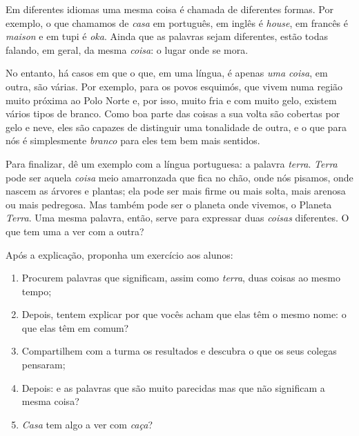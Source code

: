 \documentclass[11pt]{extarticle}
\begin{document}
Em diferentes idiomas uma mesma coisa é chamada de diferentes formas.
Por exemplo, o que chamamos de \textit{casa} em português, em inglês 
é \textit{house}, em francês é \textit{maison} e em tupi é \textit{oka}. 
Ainda que as palavras sejam diferentes, estão todas falando, em geral, 
da mesma \textit{coisa}: o lugar onde se mora. 


No entanto, há casos em que o que, em uma língua, é apenas \textit{uma coisa},
em outra, são várias. Por exemplo, para os povos esquimós, que vivem
numa região muito próxima ao Polo Norte e, por isso, muito fria e com
muito gelo, existem vários tipos de branco. Como boa parte das coisas
a sua volta são cobertas por gelo e neve, eles são capazes de distinguir 
uma tonalidade de outra, e o que para nós é simplesmente \textit{branco}
para eles tem bem mais sentidos. 

Para finalizar, dê um exemplo com a língua portuguesa: a palavra \textit{terra}.
\textit{Terra} pode ser aquela \textit{coisa} meio amarronzada que fica no 
chão, onde nós pisamos, onde nascem as árvores e plantas; ela pode 
ser mais firme ou mais solta, mais arenosa ou mais pedregosa.
Mas também pode ser o planeta onde vivemos, o Planeta \textit{Terra}. 
Uma mesma palavra, então, serve para expressar duas \textit{coisas} diferentes. 
O que tem uma a ver com a outra? 

Após a explicação, proponha um exercício aos alunos:

\begin{enumerate}
\item Procurem palavras que significam, assim como \textit{terra}, 
duas coisas ao mesmo tempo;

\item Depois, tentem explicar por que vocês acham que elas têm o mesmo nome:
o que elas têm em comum?

\item Compartilhem com a turma os resultados e descubra o que os seus
colegas pensaram;

\item Depois: e as palavras que são muito parecidas mas 
que não significam a mesma coisa? 

\item \textit{Casa} tem algo a ver com \textit{caça}?
\end{enumerate}
\end{document}
